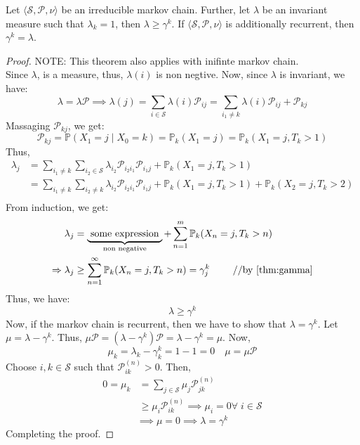 \begin{theorem}
    Let \(\langle \mathcal{S} , \mathcal{P} , \nu \rangle\) be an irreducible markov chain. Further, let 
    \(\lambda\) be an invariant measure such that \(\lambda _k = 1\), then \(\lambda \geq  \gamma ^k\). If 
    \(\langle \mathcal{S} ,\mathcal{P} ,\nu \rangle \) is additionally recurrent, then \( \gamma^k = \lambda\).
\end{theorem}
\begin{proof}
    NOTE: This theorem also applies with inifinte markov chain.\\
    Since \(\lambda\), is a measure, thus, \(\lambda(i)\) is non negtive. Now, since \(\lambda\) is invariant, we have:
    \[
        \lambda = \lambda \mathcal{P} \implies \lambda(j) = \sum_{i \in \mathcal{S}} \lambda(i) \mathcal{P}_{ij}
        = \sum_{i_1 \neq k} \lambda(i) \mathcal{P}_{ij} + \mathcal{P}_{kj}
    \]
    Massaging \(\mathcal{P}_{kj} \), we get:
    \[
        \mathcal{P}_{kj} = \mathbb{P} (X_1 = j \mid X_0 = k) = \mathbb{P}_k (X_1 = j) = \mathbb{P}_k (X_1 = j, T_k > 1)
    \]
    Thus,
    \[
        \begin{aligned}
            \lambda _j &= \sum_{i_1 \neq k} \sum_{i_2 \in \mathcal{S} } 
            \lambda_{i_2} \mathcal{P}_{i_2 i_1} \mathcal{P}_{i_1 j} + \mathbb{P}_k (X_1 = j, T_k > 1) \\
            & = \sum_{i_1 \neq k} \sum_{i_2 \neq k} \lambda_{i_2} \mathcal{P}_{i_2 i_1}
             \mathcal{P}_{i_1 j} + \mathbb{P}_k (X_1 = j, T_k > 1) + \mathbb{P}_k (X_2 = j, T_k > 2) \\
        \end{aligned}
    \]
    From induction, we get:
    \[
        \begin{aligned}
            \lambda _j &= \underbrace{\text{ some expression }}_{\text{non negative}} +
            \sum_{n=1}^{m} \mathbb{P}_k (X_n = j, T_k > n)\\
            \implies  \lambda _j &\geq \sum_{n=1}^{\infty} \mathbb{P}_k (X_n = j, T_k > n) = \gamma _j^k \hfill 
            \qquad \text{ //by \autoref{thm:gamma}}\\
        \end{aligned}
    \]
    Thus, we have:
    \[
        \lambda \geq \gamma ^k
    \]
    Now, if the markov chain is recurrent, then we have to show that \(\lambda = \gamma ^k\).
    Let \(\mu = \lambda -\gamma ^k\). Thus, \(\mu \mathcal{P} = (\lambda - \gamma ^k) \mathcal{P} = \lambda - \gamma ^k = \mu\).
    Now,
    \[
        \mu _k = \lambda _k - \gamma _k^k = 1 - 1 = 0 \quad \mu = \mu \mathcal{P}
    \]
    Choose \(i,k \in \mathcal{S}\) such that \(\mathcal{P}_{ik}^{(n)} > 0\). Then,
    \[
        \begin{aligned}
            0 = \mu _k &= \sum_{j \in \mathcal{S}} \mu _j \mathcal{P}_{jk}^{(n)} \\
            & \geq \mu _i \mathcal{P}_{ik}^{(n)} \implies \mu _i = 0 \forall \; i \in \mathcal{S}
        \end{aligned}
    \]
    \[
        \implies \mu = 0 \implies \lambda = \gamma ^k
    \]
    Completing the proof.
\end{proof}
